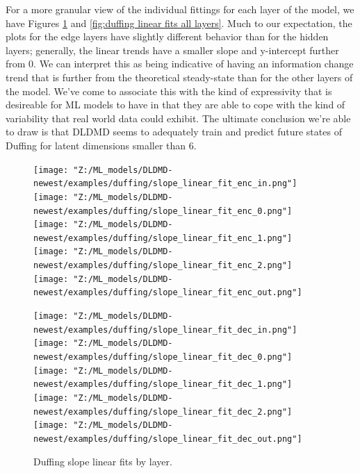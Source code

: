 For a more granular view of the individual fittings for each layer of the model, we have Figures 
\ref{fig:duffing slopes all layers} and \ref{fig:duffing linear fits all layers}. Much to our 
expectation, the plots for the edge layers have slightly different behavior than for the hidden layers;
generally, the linear trends have a smaller slope and y-intercept further from 0. We can interpret this 
as being indicative of having an information change trend that is further from the theoretical steady-state
than for the other layers of the model. We've come to associate this with the kind of expressivity that is
desireable for ML models to have in that they are able to cope with the kind of variability that real world 
data could exhibit. The ultimate conclusion we're able to draw is that DLDMD seems to adequately train and 
predict future states of Duffing for latent dimensions smaller than 6.

\begin{figure}[!htbp]
    \centering
    \begin{minipage}{.5\textwidth}
        \texttt{[image: "Z:/ML\_models/DLDMD-newest/examples/duffing/slope\_linear\_fit\_enc\_in.png"]} 
        \texttt{[image: "Z:/ML\_models/DLDMD-newest/examples/duffing/slope\_linear\_fit\_enc\_0.png"]} 
        \texttt{[image: "Z:/ML\_models/DLDMD-newest/examples/duffing/slope\_linear\_fit\_enc\_1.png"]} 
        \texttt{[image: "Z:/ML\_models/DLDMD-newest/examples/duffing/slope\_linear\_fit\_enc\_2.png"]} 
        \texttt{[image: "Z:/ML\_models/DLDMD-newest/examples/duffing/slope\_linear\_fit\_enc\_out.png"]} 
    \end{minipage}%
    \begin{minipage}{.5\textwidth}
        \texttt{[image: "Z:/ML\_models/DLDMD-newest/examples/duffing/slope\_linear\_fit\_dec\_in.png"]} 
        \texttt{[image: "Z:/ML\_models/DLDMD-newest/examples/duffing/slope\_linear\_fit\_dec\_0.png"]} 
        \texttt{[image: "Z:/ML\_models/DLDMD-newest/examples/duffing/slope\_linear\_fit\_dec\_1.png"]} 
        \texttt{[image: "Z:/ML\_models/DLDMD-newest/examples/duffing/slope\_linear\_fit\_dec\_2.png"]} 
        \texttt{[image: "Z:/ML\_models/DLDMD-newest/examples/duffing/slope\_linear\_fit\_dec\_out.png"]} 
    \end{minipage}
    \caption{Duffing slope linear fits by layer.}
    \label{fig:duffing slopes all layers}
\end{figure}

